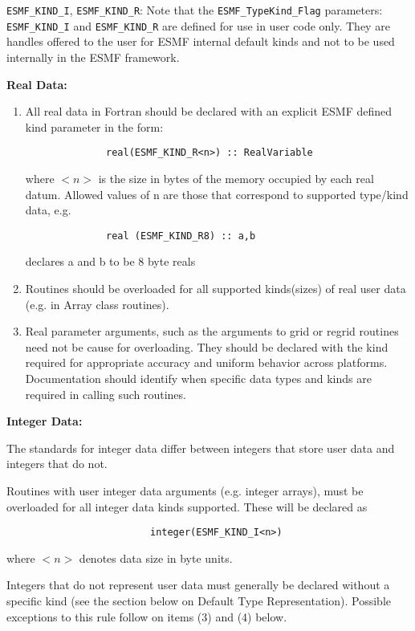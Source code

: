 {\tt ESMF\_KIND\_I}, {\tt ESMF\_KIND\_R}: Note that the {\tt ESMF\_TypeKind\_Flag} parameters: {\tt ESMF\_KIND\_I} and {\tt ESMF\_KIND\_R} are defined for use in user code only. They are handles offered to the user for ESMF internal default kinds and not to be used internally in the ESMF framework.

{\bf Real Data:}
\begin{enumerate}
\item All real data in Fortran should be declared with an explicit ESMF defined kind parameter in the form:
\begin{verbatim}
              real(ESMF_KIND_R<n>) :: RealVariable
\end{verbatim}

      where $<n>$ is the size in bytes of the memory occupied by each real datum. Allowed values of n are those that correspond to supported type/kind data, e.g.
\begin{verbatim}
              real (ESMF_KIND_R8) :: a,b
\end{verbatim}
      declares a and b to be 8 byte reals

\item Routines should be overloaded for all supported kinds(sizes) of real user data (e.g. in Array class routines).

\item Real parameter arguments, such as the arguments to grid or regrid routines need not be cause for overloading. They should be declared with the kind required for appropriate accuracy and uniform behavior across platforms. Documentation should identify when specific data types and kinds are required in calling such routines.
\end{enumerate}

{\bf Integer Data:}

The standards for integer data differ between integers that store user data and integers that do not.

Routines with user integer data arguments (e.g. integer arrays), must be overloaded for all integer data kinds supported. These will be declared as
\begin{verbatim}
                         integer(ESMF_KIND_I<n>)
\end{verbatim}
where $<n>$ denotes data size in byte units.

Integers that do not represent user data must generally be declared without a specific kind (see the section below on Default Type Representation). Possible exceptions to this rule follow on items (3) and (4) below.

